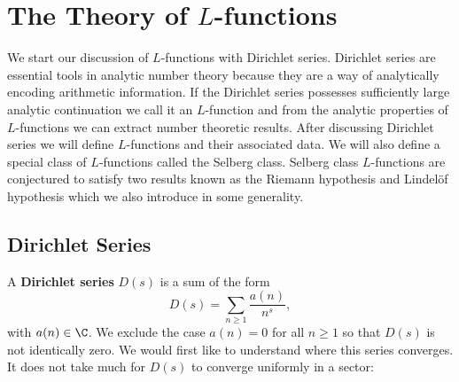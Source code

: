 \chapter{The Theory of \texorpdfstring{$L$}{L}-functions}
  We start our discussion of $L$-functions with Dirichlet series. Dirichlet series are essential tools in analytic number theory because they are a way of analytically encoding arithmetic information. If the Dirichlet series possesses sufficiently large analytic continuation we call it an $L$-function and from the analytic properties of $L$-functions we can extract number theoretic results. After discussing Dirichlet series we will define $L$-functions and their associated data. We will also define a special class of $L$-functions called the Selberg class. Selberg class $L$-functions are conjectured to satisfy two results known as the Riemann hypothesis and Lindel\"of hypothesis which we also introduce in some generality.
  \section{Dirichlet Series}
    A \textbf{Dirichlet series} $D(s)$ is a sum of the form
    \[
      D(s) = \sum_{n \ge 1}\frac{a(n)}{n^{s}},
    \]
    with $a(n) \in \C$. We exclude the case $a(n) = 0$ for all $n \ge 1$ so that $D(s)$ is not identically zero. We would first like to understand where this series converges. It does not take much for $D(s)$ to converge uniformly in a sector:

